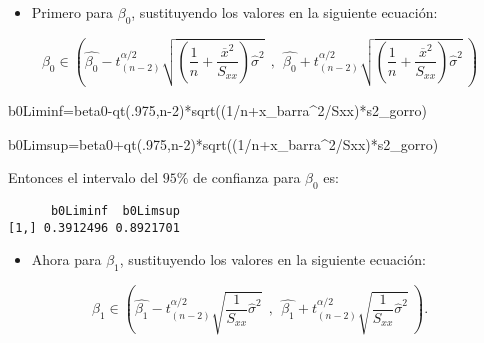 \documentclass[
  a4paper,
  oneside,
  openany]{book}
\newenvironment{Shaded}{\begin{snugshade}}{\end{snugshade}}
\newcommand{\DecValTok}[1]{\textcolor[rgb]{0.00,0.00,0.81}{#1}}
\newcommand{\FunctionTok}[1]{\textcolor[rgb]{0.00,0.00,0.00}{#1}}
\newcommand{\NormalTok}[1]{#1}
\newcommand{\OtherTok}[1]{\textcolor[rgb]{0.56,0.35,0.01}{#1}}
\newcommand{\SpecialCharTok}[1]{\textcolor[rgb]{0.00,0.00,0.00}{#1}}
\providecommand{\tightlist}{%
  \setlength{\itemsep}{0pt}\setlength{\parskip}{0pt}}
\begin{document}
\begin{itemize}
\tightlist
\item
  Primero para \(\beta_{0}\), sustituyendo los valores en la siguiente ecuación:
\end{itemize}

\[\beta_{0} \in \left( \hat{\beta_{0}}-t^{\alpha/2}_{(n-2)}\sqrt{\left(\frac{1}{n}+\frac{\overline{x}^2}{S_{xx}}\right)\hat{\sigma}^2} \ \ , \ \ \hat{\beta_{0}}+t^{\alpha/2}_{(n-2)}\sqrt{\left(\frac{1}{n}+\frac{\overline{x}^2}{S_{xx}}\right)\hat{\sigma}^2} \ \right)\]

\begin{Shaded}
\begin{Highlighting}[]
\NormalTok{b0Liminf}\OtherTok{=}\NormalTok{beta0}\SpecialCharTok{{-}}\FunctionTok{qt}\NormalTok{(.}\DecValTok{975}\NormalTok{,n}\DecValTok{{-}2}\NormalTok{)}\SpecialCharTok{*}\FunctionTok{sqrt}\NormalTok{((}\DecValTok{1}\SpecialCharTok{/}\NormalTok{n}\SpecialCharTok{+}\NormalTok{x\_barra}\SpecialCharTok{\^{}}\DecValTok{2}\SpecialCharTok{/}\NormalTok{Sxx)}\SpecialCharTok{*}\NormalTok{s2\_gorro)}

\NormalTok{b0Limsup}\OtherTok{=}\NormalTok{beta0}\SpecialCharTok{+}\FunctionTok{qt}\NormalTok{(.}\DecValTok{975}\NormalTok{,n}\DecValTok{{-}2}\NormalTok{)}\SpecialCharTok{*}\FunctionTok{sqrt}\NormalTok{((}\DecValTok{1}\SpecialCharTok{/}\NormalTok{n}\SpecialCharTok{+}\NormalTok{x\_barra}\SpecialCharTok{\^{}}\DecValTok{2}\SpecialCharTok{/}\NormalTok{Sxx)}\SpecialCharTok{*}\NormalTok{s2\_gorro)}
\end{Highlighting}
\end{Shaded}

Entonces el intervalo del \(95\%\) de confianza para \(\beta_{0}\) es:

\begin{verbatim}
      b0Liminf  b0Limsup
[1,] 0.3912496 0.8921701
\end{verbatim}

\begin{itemize}
\tightlist
\item
  Ahora para \(\beta_1\), sustituyendo los valores en la siguiente ecuación:
\end{itemize}

\[\beta_{1} \in \left( \hat{\beta_{1}}-t^{\alpha/2}_{(n-2)} \sqrt{\frac{1}{S_{xx}}\hat{\sigma}^2} \ \ , \ \ \hat{\beta_{1}}+t^{\alpha/2}_{(n-2)} \sqrt{\frac{1}{S_{xx}}\hat{\sigma}^2} \ \right).\]
\end{document}
